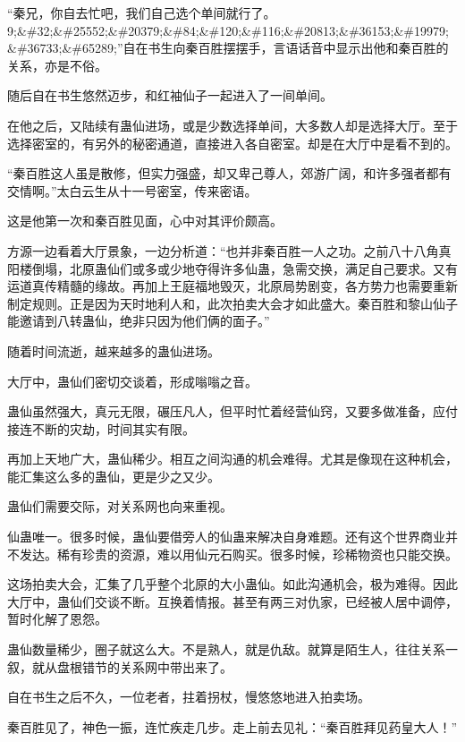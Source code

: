 
\begin{this_body}

“秦兄，你自去忙吧，我们自己选个单间就行了。9;\&\#32;\&\#25552;\&\#20379;\&\#84;\&\#120;\&\#116;\&\#20813;\&\#36153;\&\#19979;\&\#36733;\&\#65289;”自在书生向秦百胜摆摆手，言语话音中显示出他和秦百胜的关系，亦是不俗。

随后自在书生悠然迈步，和红袖仙子一起进入了一间单间。

在他之后，又陆续有蛊仙进场，或是少数选择单间，大多数人却是选择大厅。至于选择密室的，有另外的秘密通道，直接进入各自密室。却是在大厅中是看不到的。

“秦百胜这人虽是散修，但实力强盛，却又卑己尊人，郊游广阔，和许多强者都有交情啊。”太白云生从十一号密室，传来密语。

这是他第一次和秦百胜见面，心中对其评价颇高。

方源一边看着大厅景象，一边分析道：“也并非秦百胜一人之功。之前八十八角真阳楼倒塌，北原蛊仙们或多或少地夺得许多仙蛊，急需交换，满足自己要求。又有运道真传精髓的缘故。再加上王庭福地毁灭，北原局势剧变，各方势力也需要重新制定规则。正是因为天时地利人和，此次拍卖大会才如此盛大。秦百胜和黎山仙子能邀请到八转蛊仙，绝非只因为他们俩的面子。”

随着时间流逝，越来越多的蛊仙进场。

大厅中，蛊仙们密切交谈着，形成嗡嗡之音。

蛊仙虽然强大，真元无限，碾压凡人，但平时忙着经营仙窍，又要多做准备，应付接连不断的灾劫，时间其实有限。

再加上天地广大，蛊仙稀少。相互之间沟通的机会难得。尤其是像现在这种机会，能汇集这么多的蛊仙，更是少之又少。

蛊仙们需要交际，对关系网也向来重视。

仙蛊唯一。很多时候，蛊仙要借旁人的仙蛊来解决自身难题。还有这个世界商业并不发达。稀有珍贵的资源，难以用仙元石购买。很多时候，珍稀物资也只能交换。

这场拍卖大会，汇集了几乎整个北原的大小蛊仙。如此沟通机会，极为难得。因此大厅中，蛊仙们交谈不断。互换着情报。甚至有两三对仇家，已经被人居中调停，暂时化解了恩怨。

蛊仙数量稀少，圈子就这么大。不是熟人，就是仇敌。就算是陌生人，往往关系一叙，就从盘根错节的关系网中带出来了。

自在书生之后不久，一位老者，拄着拐杖，慢悠悠地进入拍卖场。

秦百胜见了，神色一振，连忙疾走几步。走上前去见礼：“秦百胜拜见药皇大人！”


\end{this_body}
